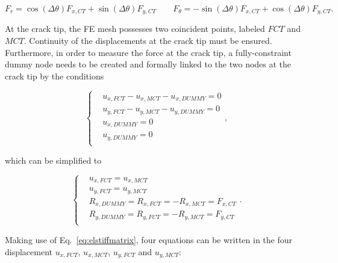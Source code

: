 \documentclass[review]{elsarticle}
\begin{document}
\begin{equation}
F_{r}=\cos\left(\Delta\theta\right) F_{x,CT}+\sin\left(\Delta\theta\right) F_{y,CT}\qquad F_{\theta}=-\sin\left(\Delta\theta\right) F_{x,CT}+\cos\left(\Delta\theta\right) F_{y,CT}.
\end{equation}

At the crack tip, the FE mesh possesses two coincident points, labeled $FCT$ and $MCT$. Continuity of the displacements at the crack tip must be ensured. Furthermore, in order to measure the force at the crack tip, a fully-constraint dummy node needs to be created and formally linked to the two nodes at the crack tip by the conditions 

\begin{equation}
\begin{cases}
&u_{x,FCT}-u_{x,MCT}-u_{x,DUMMY}=0\\
&u_{y,FCT}-u_{y,MCT}-u_{y,DUMMY}=0\\[10pt]
&u_{x,DUMMY}=0\\
&u_{y,DUMMY}=0\\
\end{cases},
\end{equation}

which can be simplified to

\begin{equation}
\begin{cases}
&u_{x,FCT}=u_{x,MCT}\\
&u_{y,FCT}=u_{y,MCT}\\[10pt]
&R_{x,DUMMY}=R_{x,FCT}=-R_{x,MCT}=F_{x,CT}\\
&R_{y,DUMMY}=R_{y,FCT}=-R_{y,MCT}=F_{y,CT}\\
\end{cases}.
\end{equation}

Making use of Eq.~\ref{eq:elstiffmatrix}, four equations can be written in the four displacement $u_{x,FCT}$, $u_{x,MCT}$, $u_{y,FCT}$ and $u_{y,MCT}$:
\end{document}
